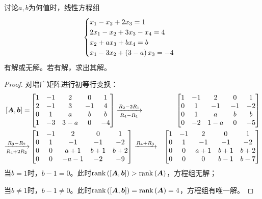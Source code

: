 \begin{problem}\label{problem-2.5}
讨论\(a,b\)为何值时，线性方程组
\begin{equation*}
    \begin{cases}
        x_1-x_2+2x_3=1             \\
        2x_1-x_2+3x_3-x_4=4        \\
        x_2+ax_3+bx_4=b            \\
        x_1-3x_2+\left( 3-a \right)x_3=-4 \\
    \end{cases}
\end{equation*}
有解或无解。若有解，求出其解。
\end{problem}
\begin{proof}
    对增广矩阵进行初等行变换：
    \begin{align*}
        \left[ \boldsymbol{A},\boldsymbol{b} \right]=
         & \begin{bmatrix}
               1 & -1 & 2   & 0  & 1  \\
               2 & -1 & 3   & -1 & 4  \\
               0 & 1  & a   & b  & b  \\
               1 & -3 & 3-a & 0  & -4
           \end{bmatrix}\xrightarrow[R_4-R_1]{R_2-2R_1}
         & \begin{bmatrix}
               1 & -1 & 2   & 0  & 1  \\
               0 & 1  & -1  & -1 & -2 \\
               0 & 1  & a   & b  & b  \\
               0 & -2 & 1-a & 0  & -5
           \end{bmatrix}                       \\
        \xrightarrow[R_4+2R_2]{R_3-R_2}
         & \begin{bmatrix}
               1 & -1 & 2    & 0   & 1   \\
               0 & 1  & -1   & -1  & -2  \\
               0 & 0  & a+1  & b+1 & b+2 \\
               0 & 0  & -a-1 & -2  & -9
           \end{bmatrix}\xrightarrow{R_4+R_3}
         & \begin{bmatrix}
               1 & -1 & 2   & 0   & 1   \\
               0 & 1  & -1  & -1  & -2  \\
               0 & 0  & a+1 & b+1 & b+2 \\
               0 & 0  & 0   & b-1 & b-7
           \end{bmatrix}
    \end{align*}
    当\(b=1\)时，\(b-1=0\)。此时\(\mathrm{rank}\left( \left[ \boldsymbol{A},\boldsymbol{b} \right] \right)>\mathrm{rank}\left( \boldsymbol{A} \right)\)，方程组无解；

    当\(b\neq1\)时，\(b-1\neq0\)。此时\(\mathrm{rank}\left( \left[ \boldsymbol{A},\boldsymbol{b} \right] \right)=\mathrm{rank}\left( \boldsymbol{A} \right)=4\)，方程组有唯一解。

\end{proof}


